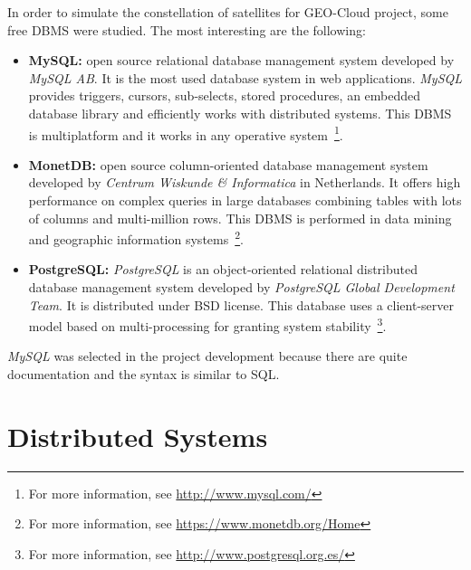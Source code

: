 In order to simulate the constellation of satellites for GEO-Cloud project, some
free \ac{DBMS} were studied. The most interesting are the following:
\begin{itemize}
\item \textbf{MySQL:} open source relational database management system developed by
  \emph{MySQL AB}. It is the most used database system in web applications. \emph{MySQL} provides triggers, cursors, sub-selects, stored
  procedures, an embedded database library and efficiently works with distributed systems. This \ac{DBMS} is multiplatform and it works in any
  operative system~\footnote{For more information, see \url{http://www.mysql.com/}}.
\item \textbf{MonetDB:} open source column-oriented database management system
  developed by \emph{Centrum Wiskunde \& Informatica} in Netherlands. It offers
  high performance on complex queries in large databases combining tables with
  lots of columns and multi-million rows. This \ac{DBMS} is performed in data
  mining and geographic information systems~\footnote{For more information, see \url{https://www.monetdb.org/Home}}.
\item \textbf{PostgreSQL:} \emph{PostgreSQL} is an object-oriented relational
  distributed database management system developed by \emph{PostgreSQL Global
    Development Team}. It is distributed under \ac{BSD} license. This database uses a
  client-server model based on multi-processing for granting system stability~\footnote{For more information, see \url{http://www.postgresql.org.es/}}.
\end{itemize}

\emph{MySQL} was selected in the project development because there are quite documentation and the
syntax is similar to \ac{SQL}.

\section{Distributed Systems}

